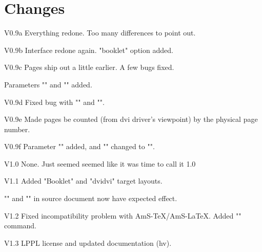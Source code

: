 \documentclass[12pt]{article}
\newcommand\namelistlabel[1]{\mbox{\bf #1}\hfil}
\newenvironment{namelist}[1]%
  {\begin{list}{}%
    {\let\makelabel\namelistlabel
    \settowidth{\labelwidth}{#1}
    \setlength{\leftmargin}{1.1\labelwidth}}}%
 {\end{list}}
\begin{document}
\section{Changes}
\begin{namelist}{V0.9xxx}
\raggedright

\item [V0.9a] Everything redone. Too many differences to point out.

\item [V0.9b] Interface redone again. "booklet" option added.

\item [V0.9c] Pages ship out a little earlier. A few bugs fixed.

  Parameters "\pageseplength" and "\pagesepthickness" added.

\item [V0.9d] Fixed bug with "\twoupclearpage" and "\twoupeject".

\item [V0.9e] Made pages be counted (from dvi driver's viewpoint) by the
physical page number.

\item [V0.9f] Parameter "\pagesepoffset" added, and "\pagesepthickness"
changed to "\pagesepwidth".

\item [V1.0]  None. Just seemed seemed like it was time to call it 1.0

\item [V1.1] Added "Booklet" and "dvidvi" target layouts.

  "\hoffset" and "\voffset" in source document now have expected effect.

\item[V1.2] Fixed incompatibility problem with AmS-\TeX/AmS-\LaTeX.
  Added "\TwoupWrites" command.
\item[V1.3] LPPL license and updated documentation (hv).

\end{namelist}
\end{document}
